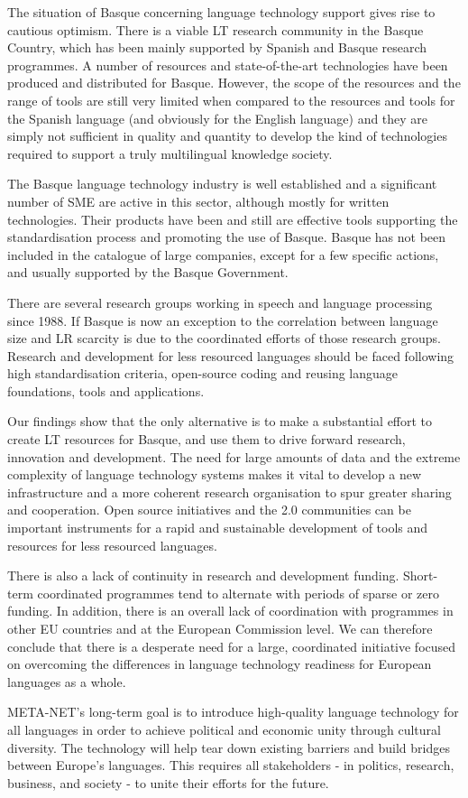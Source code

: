 \begin{multicols}{2}
   The situation of Basque concerning language technology support gives rise to cautious optimism. There is a viable LT research community in the Basque Country, which has been mainly supported by Spanish and Basque research programmes. A number of resources and state-of-the-art technologies have been produced and distributed for Basque. However, the scope of the resources and the range of tools are still very limited when compared to the resources and tools for the Spanish language (and obviously for the English language) and they are simply not sufficient in quality and quantity to develop the kind of technologies required to support a truly multilingual knowledge society.

    The Basque language technology industry is well established and a significant number of SME are active in this sector, although mostly for written technologies.  Their products have been and still are effective tools supporting the standardisation process and promoting the use of Basque.  Basque has not been included in the catalogue of large companies, except for a few specific actions, and usually supported by the Basque Government. 

There are several research groups working in speech and language processing since 1988. If Basque is now an exception to the correlation between language size and LR scarcity is due to the coordinated efforts of those research groups. Research and development for less resourced languages should be faced following high standardisation criteria, open-source coding and reusing   language foundations, tools and applications. 

    Our findings show that the only alternative is to make a substantial effort to create LT resources for Basque, and use them to drive forward research, innovation and development. The need for large amounts of data and the extreme complexity of language technology systems makes it vital to develop a new infrastructure and a more coherent research organisation to spur greater sharing and cooperation. Open source initiatives and the 2.0 communities can be important instruments for a rapid and sustainable development of tools and resources for less resourced languages.

   There is also a lack of continuity in research and development funding. Short-term coordinated programmes tend to alternate with periods of sparse or zero funding. In addition, there is an overall lack of coordination with programmes in other EU countries and at the European Commission level. We can therefore conclude that there is a desperate need for a large, coordinated initiative focused on overcoming the differences in language technology readiness for European languages as a whole.

    META-NET’s long-term goal is to introduce high-quality language technology for all languages in order to achieve political and economic unity through cultural diversity. The technology will help tear down existing barriers and build bridges between Europe’s languages. This requires all stakeholders - in politics, research, business, and society - to unite their efforts for the future. 
\end{multicols}

